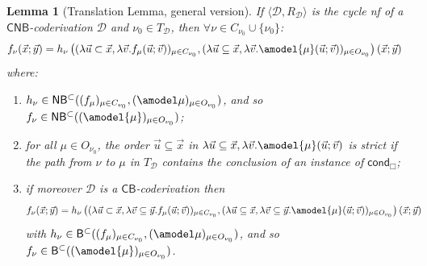 \documentclass[manuscript,screen]{acmart}
\renewcommand{\emptyset}{\varnothing}
\newtheorem{lem}[thm]{Lemma}
\theoremstyle{definition}
\theoremstyle{remark}
\newcommand{\permpref}{\subset}
\newcommand{\sq}{\Box}
\newcommand{\cnd}{\mathsf{cond}}
\newcommand{\model}[1]{\denot{#1}}
\newcommand{\denot}[1]{f_{#1}}
\newcommand{\bc}{\mathsf{B}}
\newcommand{\bcwfpo}[1]{\bc^{#1}}
\newcommand{\nested}{\mathsf{N}}
\newcommand{\nbcwfpo}[1]{\nested\bcwfpo{#1}}
\newcommand{\bcpp}{\bcwfpo{\permpref}}
\newcommand{\nbcpp}{\nbcwfpo{\permpref}}
\newcommand{\der}{\mathcal{D}}
\newcommand{\pder}[1]{\der_{#1}}
\newcommand{\rd}{{R}_\der}
\newcommand{\derrd}{\langle \der, \rd \rangle}
\newcommand{\close}[1]{{C}_{#1}}
\newcommand{\open}[1]{{O}_{#1}}
\newcommand{\hnu}{\nu_0}
\newcommand{\cyclic}{\mathsf{C}}
\newcommand{\cbc}{\cyclic\bc}
\newcommand{\ncbc}{\cyclic\nested\bc}
\begin{document}
\begin{lem}[Translation Lemma, general version]\label{lem:translation}
If $\derrd$ is the cycle nf of a $\ncbc$-coderivation $\der$ and  $\hnu\in T_\der$, 
    then $\forall \nu \in \close  \hnu \cup \{ \hnu\}$:
    \begin{equation*}
     \label{eqn:translationlemmaequation1}
    \begin{aligned}
     \model{ \nu}(\vec{x}; \vec{y})&=h_{\nu}\left(( \lambda \vec{u}\subset \vec{x},\lambda \vec v. \model{ \mu}(\vec{u};\vec v))_{\mu \in \close \hnu },( \lambda \vec{u}\subseteq \vec{x},\lambda \vec v. \amodel{ \mu}(\vec{u};\vec v))_{\mu \in  \open \hnu}\right)(\vec{x}; \vec{y})
    \end{aligned}
    \end{equation*}
    where:
    \begin{enumerate}
    \item \label{enum:a} $h_\nu \in \nbcpp( (\model{\mu})_{\mu \in \close \hnu}, (\amodel \mu)_{\mu \in \open \hnu})$, and so    $\model{ \nu}\in  \nbcpp( (\amodel{ \mu})_{\mu \in \open \hnu})$;
    \item \label{enum:b}  for all $\mu \in \open \hnu$, the order $\vec u \subseteq \vec x$ in $\lambda \vec{u}\subseteq \vec{x},\lambda \vec v. \amodel{ \mu}(\vec{u};\vec v)$ is strict  if the path from $\nu$ to $\mu$ in $T_\der$ contains the conclusion of an instance of  $\cnd_{\sq}$;
    \item \label{enum:d}  if moreover   $\der$ is a $\cbc$-coderivation  then 
    \begin{equation*}
     \begin{aligned}
     \model{ \nu}(\vec{x}; \vec{y})&=h_{\nu}\left(( \lambda \vec{u}\subset \vec{x},\lambda \vec v\subseteq \vec y. \model{ \mu}(\vec{u};\vec v))_{\mu \in \close \hnu },( \lambda \vec{u}\subseteq \vec{x},\lambda \vec v\subseteq \vec y. \amodel{ \mu}(\vec{u};\vec v))_{\mu \in  \open \hnu}\right)(\vec{x}; \vec{y})
    \end{aligned}
    \end{equation*}
    with $h_\nu \in \bcpp( (\model{\mu})_{\mu \in \close \hnu}, (\amodel \mu)_{\mu \in \open \hnu})$, and so    $\model{ \nu}\in  \bcpp( (\amodel{ \mu})_{\mu \in \open \hnu})$.
    \end{enumerate}
\end{lem}
\end{document}

